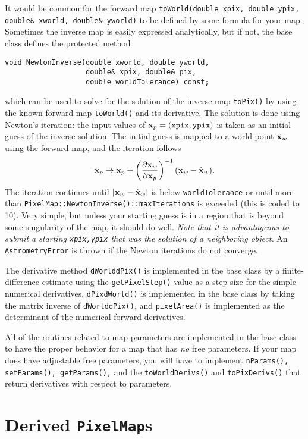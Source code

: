 \documentclass[11pt,preprint,flushrt]{aastex}
\begin{document}
It would be common for the forward map {\tt toWorld(double xpix, double ypix, double\& xworld, double\& yworld)} to be defined by some formula for your map.  Sometimes the inverse map is easily expressed analytically, but if not, the base class defines the protected method
\begin{verbatim}
void NewtonInverse(double xworld, double yworld, 
                   double& xpix, double& pix,
                   double worldTolerance) const;
\end{verbatim}
which can be used to solve for the solution of the inverse map {\tt toPix()} by using the known forward map {\tt toWorld()} and its derivative.  The solution is done using Newton's iteration: the input values of ${\bf x}_p={\tt (xpix,ypix)}$ is taken as an initial guess of the inverse solution.  The initial guess is mapped to a world point $\hat {\bf x}_w$ using the forward map, and the iteration follows
\begin{equation}
{\bf x}_p \rightarrow {\bf x}_p + \left( \frac{\partial {\bf x}_w}{\partial {\bf x}_p}\right)^{-1} ({\bf x}_w - \hat{\bf x}_w).
\end{equation}
The iteration continues until $|{\bf x}_w - \hat{\bf x}_w|$ is below {\tt worldTolerance} or until more than {\tt PixelMap::NewtonInverse()::maxIterations} is exceeded (this is coded to 10).  Very simple, but unless your starting guess is in a region that is beyond some singularity of the map, it should do well.  {\em Note that it is advantageous to submit a starting {\tt xpix,ypix} that was the solution of a neighboring object.}  An {\tt AstrometryError} is thrown if the Newton iterations do not converge.

The derivative method {\tt dWorlddPix()} is implemented in the base class by a finite-difference estimate using the {\tt getPixelStep()} value as a step size for the simple numerical derivatives.  {\tt dPixdWorld()} is implemented in the base class by taking the matrix inverse of {\tt dWorlddPix()},  and {\tt pixelArea()} is implemented as the determinant of the numerical forward derivatives.

All of the routines related to map parameters are implemented in the base class to have the proper behavior for a map that has {\em no} free parameters.  If your map does have adjustable free parameters, you will have to implement {\tt nParams(), setParams(), getParams(),} and the {\tt toWorldDerivs()} and {\tt toPixDerivs()} that return derivatives with respect to parameters.

\section{Derived {\tt PixelMap}s}
\end{document}
